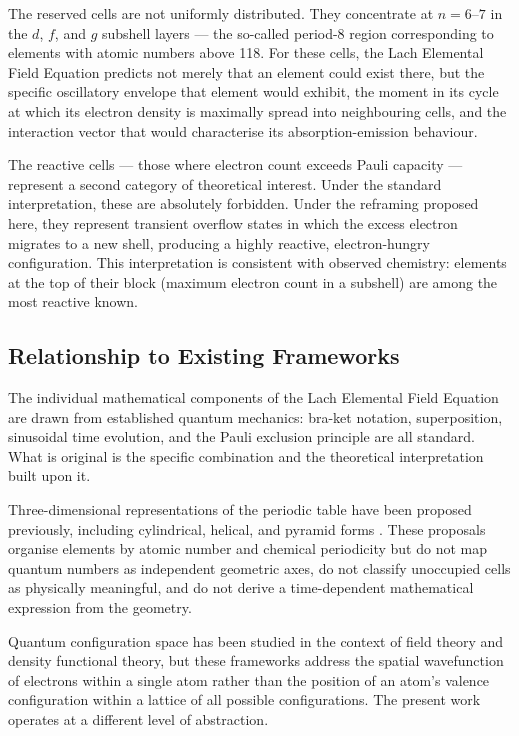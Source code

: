 \documentclass[12pt, a4paper]{article}
\begin{document}
The reserved cells are not uniformly distributed. They concentrate at $n = 6$--$7$ in the
$d$, $f$, and $g$ subshell layers --- the so-called period-8 region corresponding to elements
with atomic numbers above 118. For these cells, the Lach Elemental Field Equation predicts
not merely that an element could exist there, but the specific oscillatory envelope that
element would exhibit, the moment in its cycle at which its electron density is maximally
spread into neighbouring cells, and the interaction vector that would characterise its
absorption-emission behaviour.

The reactive cells --- those where electron count exceeds Pauli capacity --- represent a
second category of theoretical interest. Under the standard interpretation, these are
absolutely forbidden. Under the reframing proposed here, they represent transient overflow
states in which the excess electron migrates to a new shell, producing a highly reactive,
electron-hungry configuration. This interpretation is consistent with observed chemistry:
elements at the top of their block (maximum electron count in a subshell) are among the
most reactive known.

\subsection{Relationship to Existing Frameworks}

The individual mathematical components of the Lach Elemental Field Equation are drawn
from established quantum mechanics: bra-ket notation, superposition, sinusoidal time
evolution, and the Pauli exclusion principle are all standard. What is original is the specific
combination and the theoretical interpretation built upon it.

Three-dimensional representations of the periodic table have been proposed previously,
including cylindrical, helical, and pyramid forms \cite{katz1979}. These proposals organise
elements by atomic number and chemical periodicity but do not map quantum numbers as
independent geometric axes, do not classify unoccupied cells as physically meaningful, and
do not derive a time-dependent mathematical expression from the geometry.

Quantum configuration space has been studied in the context of field theory
\cite{ashtekar1992} and density functional theory, but these frameworks address the spatial
wavefunction of electrons within a single atom rather than the position of an atom's valence
configuration within a lattice of all possible configurations. The present work operates at a
different level of abstraction.
\end{document}
